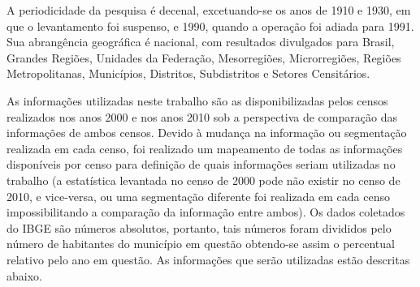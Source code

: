 A periodicidade da pesquisa é decenal, excetuando-se os anos de 1910 e 1930, em que o levantamento foi suspenso, e 1990, quando a operação foi adiada para 1991. Sua abrangência geográfica é nacional, com resultados divulgados para Brasil, Grandes Regiões, Unidades da Federação, Mesorregiões, Microrregiões, Regiões Metropolitanas, Municípios, Distritos, Subdistritos e Setores Censitários.

As informações utilizadas neste trabalho são as disponibilizadas pelos censos realizados nos anos 2000 e nos anos 2010 sob a perspectiva de comparação das informações de ambos censos. Devido à mudança na informação ou segmentação realizada em cada censo, foi realizado um mapeamento de todas as informações disponíveis por censo para definição de quais informações seriam utilizadas no trabalho (a estatística levantada no censo de 2000 pode não existir no censo de 2010, e vice-versa, ou uma segmentação diferente foi realizada em cada censo impossibilitando a comparação da informação entre ambos). Os dados coletados do IBGE são números absolutos, portanto, tais números foram divididos pelo número de habitantes do município em questão obtendo-se assim o percentual relativo pelo ano em questão. As informações que serão utilizadas estão descritas abaixo.

